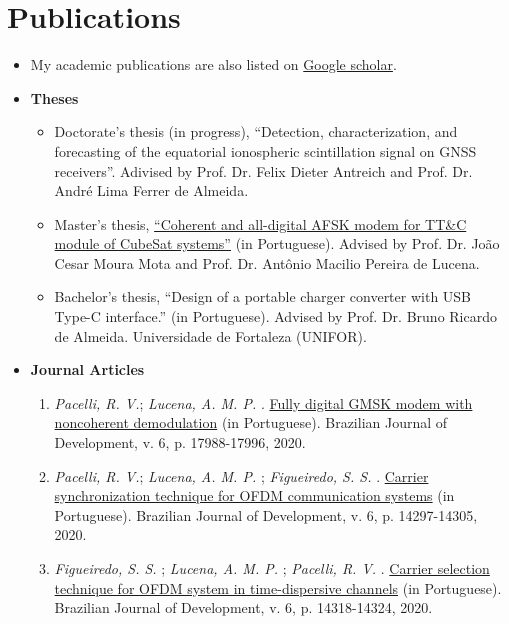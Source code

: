 \section{Publications}

\begin{itemize}[leftmargin=0.15in, label={}] %
    \item My academic publications are also listed on \href{https://scholar.google.com.br/citations?user=Kj6Gzs4AAAAJ&hl=pt-BR&oi=sra}{Google scholar}.
    \item \textbf{Theses}
    \begin{itemize}%
        \item Doctorate's thesis (in progress), ``Detection, characterization, and forecasting of the equatorial ionospheric scintillation signal on GNSS receivers''. Adivised by Prof. Dr. Felix Dieter Antreich and Prof. Dr. André Lima Ferrer de Almeida.
        \item Master's thesis, \href{http://repositorio.ufc.br/bitstream/riufc/60259/1/2021_dis_rvpacelli.pdf}{``Coherent and all-digital AFSK modem for TT\&C module of CubeSat systems''} (in Portuguese). Advised by Prof. Dr. João Cesar Moura Mota and Prof. Dr. Antônio Macilio Pereira de Lucena.
        \item Bachelor's thesis, ``Design of a portable charger converter with USB Type-C interface.'' (in Portuguese). Advised by Prof. Dr. Bruno Ricardo de Almeida. Universidade de Fortaleza (UNIFOR).
    \end{itemize}
    \item \textbf{Journal Articles}
    \begin{enumerate}[label=\textbf{J\arabic*.}, align=left, leftmargin=1.5cm]
        \item \textit{Pacelli, R. V.}; \textit{Lucena, A. M. P.} . \href{https://www.brazilianjournals.com/index.php/BRJD/article/view/8538/7345}{Fully digital GMSK modem with noncoherent demodulation} (in Portuguese). Brazilian Journal of Development, v. 6, p. 17988-17996, 2020.
        \item \textit{Pacelli, R. V.}; \textit{Lucena, A. M. P.} ; \textit{Figueiredo, S. S.} . \href{https://www.brazilianjournals.com/index.php/BRJD/article/view/7944/6883}{Carrier synchronization technique for OFDM communication systems} (in Portuguese). Brazilian Journal of Development, v. 6, p. 14297-14305, 2020.
        \item \textit{Figueiredo, S. S.} ; \textit{Lucena, A. M. P.} ; \textit{Pacelli, R. V.} . \href{https://www.brazilianjournals.com/index.php/BRJD/article/view/7946/6889}{Carrier selection technique for OFDM system in time-dispersive channels} (in Portuguese). Brazilian Journal of Development, v. 6, p. 14318-14324, 2020.

\end{enumerate}
\end{itemize}
